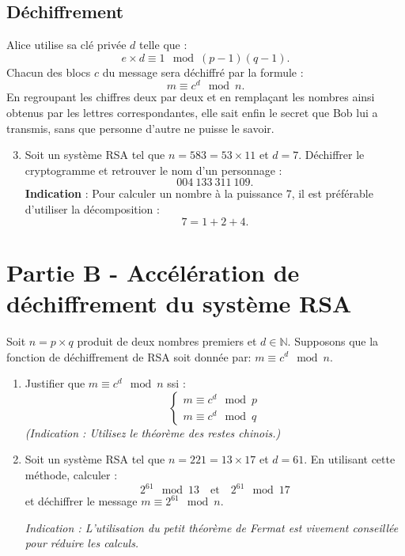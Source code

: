 {{\subsection*{Déchiffrement}

Alice utilise sa clé privée \(d\) telle que :
\[
e \times d \equiv 1 \mod (p-1)(q-1).
\]
Chacun des blocs \(c\) du message sera déchiffré par la formule :
\[
m \equiv c^d \mod n.
\]
En regroupant les chiffres deux par deux et en remplaçant les nombres ainsi obtenus par les lettres correspondantes, elle sait enfin le secret que Bob lui a transmis, sans que personne d'autre ne puisse le savoir.

\begin{enumerate}
    \setcounter{enumi}{2}
    \item Soit un système RSA tel que \(n = 583 = 53 \times 11\) et \(d = 7\). Déchiffrer le cryptogramme et retrouver le nom d’un personnage :  
    \[
    004\ 133\ 311\ 109.
    \]
    \textbf{Indication} : Pour calculer un nombre à la puissance 7, il est préférable d'utiliser la décomposition :  
    \[
    7 = 1 + 2 + 4.
    \]
\end{enumerate}

\section*{Partie B - Accélération de déchiffrement du système RSA}

Soit \(n = p \times q\) produit de deux nombres premiers et \(d \in \mathbb{N}\). Supposons que la fonction de déchiffrement de RSA soit donnée par: $m \equiv c^d \mod n.$


\begin{enumerate}
    \item Justifier que \(m \equiv c^d \mod n\) ssi :
    \[
    \begin{cases}
    m \equiv c^d \mod p \\
    m \equiv c^d \mod q
    \end{cases}
    \]
    \textit{(Indication : Utilisez le théorème des restes chinois.)}
    
    \item Soit un système RSA tel que \(n = 221 = 13 \times 17\) et \(d = 61\). En utilisant cette méthode, calculer :
    \[
    2^{61} \mod 13 \quad \text{et} \quad 2^{61} \mod 17
    \]
    et déchiffrer le message \(m \equiv 2^{61} \mod n\).

    \textit{Indication : L'utilisation du petit théorème de Fermat est vivement conseillée pour réduire les calculs.}
\end{enumerate}

}}

